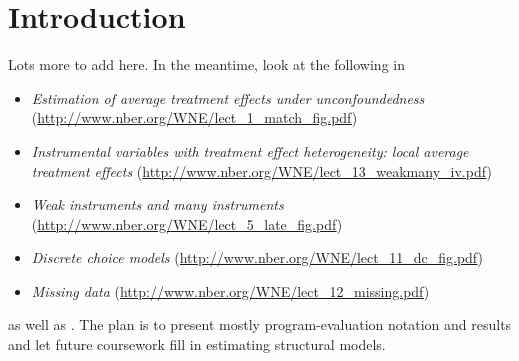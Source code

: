 

\section{Introduction}

Lots more to add here. In the meantime, look at the following in
\citet{IW07}

\begin{itemize}
\item \textit{Estimation of average treatment effects under
    unconfoundedness}
  (\url{http://www.nber.org/WNE/lect_1_match_fig.pdf})
\item \textit{Instrumental variables with treatment effect
    heterogeneity: local average treatment effects}
  (\url{http://www.nber.org/WNE/lect_13_weakmany_iv.pdf})
\item \textit{Weak instruments and many instruments}
  (\url{http://www.nber.org/WNE/lect_5_late_fig.pdf})
\item \textit{Discrete choice models}
  (\url{http://www.nber.org/WNE/lect_11_dc_fig.pdf})
\item \textit{Missing data}
  (\url{http://www.nber.org/WNE/lect_12_missing.pdf})
\end{itemize}
as well as \citet{IW09}. The plan is to present mostly
program-evaluation notation and results and let future coursework fill
in estimating structural models.

